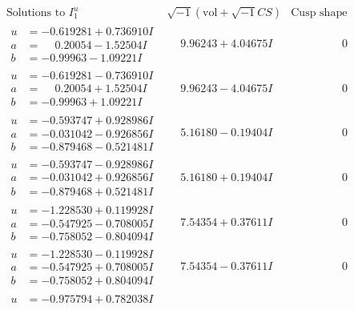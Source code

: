 \documentclass[1p]{elsarticle_modified}
\theoremstyle{definition}
\newcommand{\I}{\sqrt{-1}}
\begin{document}
$$\begin{array}{c|c|c}  
\text{Solutions to }I^u_{1}& \I (\text{vol} + \sqrt{-1}CS) & \text{Cusp shape}\\
 \hline 
\begin{aligned}
u &= -0.619281 + 0.736910 I \\
a &= \phantom{-}0.20054 - 1.52504 I \\
b &= -0.99963 - 1.09221 I\end{aligned}
 & \phantom{-}9.96243 + 4.04675 I & \phantom{-0.000000 } 0 \\ \hline\begin{aligned}
u &= -0.619281 - 0.736910 I \\
a &= \phantom{-}0.20054 + 1.52504 I \\
b &= -0.99963 + 1.09221 I\end{aligned}
 & \phantom{-}9.96243 - 4.04675 I & \phantom{-0.000000 } 0 \\ \hline\begin{aligned}
u &= -0.593747 + 0.928986 I \\
a &= -0.031042 - 0.926856 I \\
b &= -0.879468 - 0.521481 I\end{aligned}
 & \phantom{-}5.16180 - 0.19404 I & \phantom{-0.000000 } 0 \\ \hline\begin{aligned}
u &= -0.593747 - 0.928986 I \\
a &= -0.031042 + 0.926856 I \\
b &= -0.879468 + 0.521481 I\end{aligned}
 & \phantom{-}5.16180 + 0.19404 I & \phantom{-0.000000 } 0 \\ \hline\begin{aligned}
u &= -1.228530 + 0.119928 I \\
a &= -0.547925 - 0.708005 I \\
b &= -0.758052 - 0.804094 I\end{aligned}
 & \phantom{-}7.54354 + 0.37611 I & \phantom{-0.000000 } 0 \\ \hline\begin{aligned}
u &= -1.228530 - 0.119928 I \\
a &= -0.547925 + 0.708005 I \\
b &= -0.758052 + 0.804094 I\end{aligned}
 & \phantom{-}7.54354 - 0.37611 I & \phantom{-0.000000 } 0 \\ \hline\begin{aligned}
u &= -0.975794 + 0.782038 I \\

\end{aligned}
\end{array}$$
\end{document}
